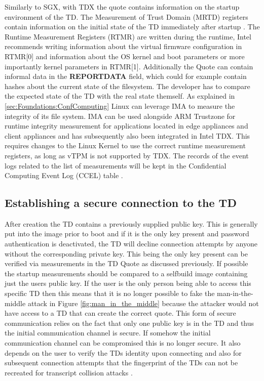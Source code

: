 \label{Identity}
Similarly to SGX, with TDX the quote contains information on the startup environment of the TD. The Measurement of Trust Domain (MRTD) registers contain information on the initial state of the TD immediately after startup \cite{intel_corporation_dcap_2024-1}. The Runtime Measurement Registers (RTMR) are written during the runtime, Intel recommends writing information about the virtual firmware configuration in RTMR[0] and information about the OS kernel and boot parameters or more importantly kernel parameters in RTMR[1]. Additionally the Quote can contain informal data in the \textbf{REPORTDATA} field, which could for example contain hashes about the current state of the filesystem. The developer has to compare the expected state of the TD with the real state themself. As explained in \ref{sec:Foundations:ConfComputing} Linux can leverage IMA to measure the integrity of its file system. IMA can be used alongside ARM Trustzone for runtime integrity measurement for applications located in edge appliances and client appliances \cite{song_tz-ima_arm_2022} and has subsequently also been integrated in Intel TDX. This requires changes to the Linux Kernel to use the correct runtime measurement registers, as long as vTPM is not supported by TDX. The records of the event logs related to the list of measurements will be kept in the Confidential Computing Event Log (CCEL) table \cite{haidong_xia_runtime_integrity_measurement_2024}. 

\subsection{Establishing a secure connection to the TD}

\label{Establishing_a_secure_connection}


\label{SSHConnection}
After creation the TD contains a previously supplied public key. This is generally put into the image prior to boot and if it is the only key present and password authentication is deactivated, the TD will decline connection attempts by anyone without the corresponding private key. This being the only key present can be verified via measurements in the TD Quote as discussed previously. If possible the startup measurements should be compared to a selfbuild image containing just the users public key. If the user is the only person being able to access this specific TD then this means that it is no longer possible to fake the man-in-the-middle attack in Figure \ref{fig:man_in_the_middle} because the attacker would not have access to a TD that can create the correct quote. This form of secure communication relies on the fact that only one public key is in the TD and thus the initial communication channel is secure. If somehow the initial communication channel can be compromised this is no longer secure. It also depends on the user to verify the TDs identity upon connecting and also for subsequent connection attempts that the fingerprint of the TDs can not be recreated for transcript collision attacks \cite{bhargavan_transcript_2016}.

